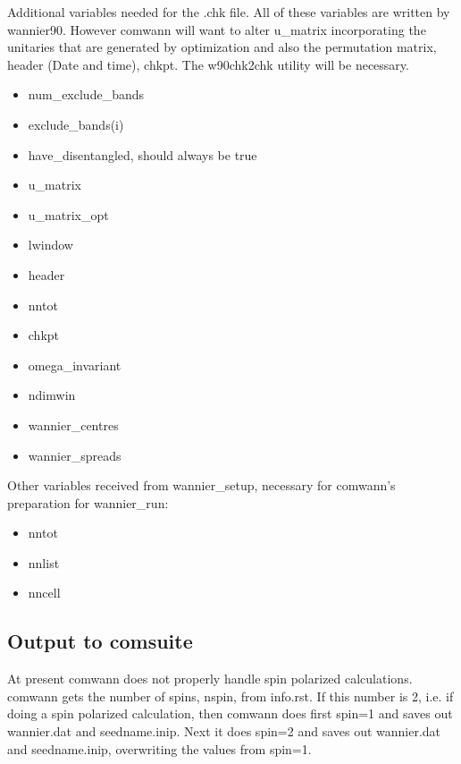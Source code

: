 \documentclass[aps,prb,singlecolumn,preprintnumbers,amsmath,amssymb]{revtex4}
\begin{document}
Additional variables needed for the .chk file.  All of these variables are written by wannier90.  However comwann will want to alter u\_matrix incorporating the unitaries that are generated by optimization and also the permutation matrix, header (Date and time), chkpt.  The w90chk2chk utility will be necessary.
\begin{itemize}
\item num\_exclude\_bands 
\item exclude\_bands(i)
\item have\_disentangled, should always be true
\item u\_matrix
\item  u\_matrix\_opt
\item  lwindow
\item  header
\item  nntot
\item  chkpt
\item  omega\_invariant
\item  ndimwin
\item  wannier\_centres
\item  wannier\_spreads
\end{itemize}


Other variables received from wannier\_setup, necessary for comwann's preparation for wannier\_run:
\begin{itemize}
\item nntot
\item nnlist
\item nncell
\end{itemize}


\subsection{Output to comsuite}

At present comwann does not properly handle spin polarized calculations.  comwann gets the number of spins, nspin, from info.rst. If this number is 2, i.e. if doing a spin polarized calculation, then comwann does first spin=1 and saves out wannier.dat and seedname.inip.  Next it does spin=2 and saves out wannier.dat and seedname.inip, overwriting the values from spin=1.
\end{document}
